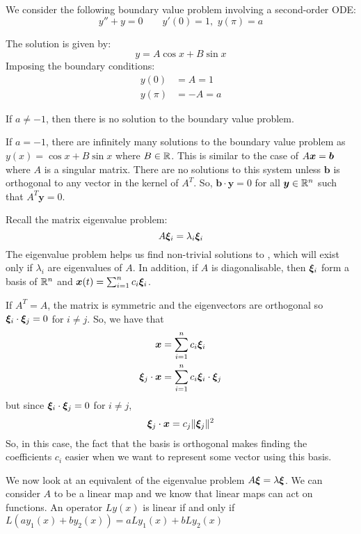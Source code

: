 \begin{eg}
	We consider the following boundary value problem involving a second-order ODE:
	\[
	y'' + y = 0 \qquad y'(0)=1, \,\, y(\pi) = a
	\]
	
	The solution is given by: 
	\[
	y = A \cos{x} + B \sin{x}
	\]
	Imposing the boundary conditions:
	\begin{align*}
		y(0) &= A = 1 \\
		y(\pi) &= -A = a
	\end{align*}
	
	If $a \neq -1$, then there is no solution to the boundary value problem.
	
	If $a = -1$, there are infinitely many solutions to the boundary value problem as $y(x) = \cos{x} + B\sin{x}$ where $B \in \mathbb{R}$. This is similar to the case of $A\bm{x} = \bm{b}$ where $A$ is a singular matrix. There are no solutions to this system unless $\bm{b}$ is orthogonal to any vector in the kernel of $A^T$. So, $\bm{b} \cdot \bm{y} = 0$ for all $\bm{y} \in \mathbb{R}^n$ such that $A^T \bm{y} = 0$.
	
	Recall the matrix eigenvalue problem: 
	\begin{equation}\label{eq4.1}
		A \bm{\xi}_i = \lambda_i \bm{\xi}_i
	\end{equation}
	The eigenvalue problem helps us find non-trivial solutions to , which will exist only if $\lambda_i$ are eigenvalues of $A$. In addition, if $A$ is diagonalisable, then $\bm{\xi}_i$ form a basis of $\mathbb{R}^n$ and $\bm{x}(t) = \sum_{i=1}^n c_i \bm{\xi}_i$.
	
	If $A^T = A$, the matrix is symmetric and the eigenvectors are orthogonal so $\bm{\xi}_i \cdot \bm{\xi}_j = 0$ for $i \neq j$. So, we have that
	\begin{align*}
		\bm{x} &= \sum_{i=1}^n c_i \bm{\xi}_i \\
		\bm{\xi}_j \cdot \bm{x} &= \sum_{i=1}^n c_i \bm{\xi}_i \cdot \bm{\xi}_j
	\end{align*}
	but since $\bm{\xi}_i \cdot \bm{\xi}_j = 0$ for $i \neq j$, 
	\begin{align*}
		\bm{\xi}_j \cdot \bm{x} = c_j \Vert \bm{\xi}_j \Vert^2
	\end{align*}
	So, in this case, the fact that the basis is orthogonal makes finding the coefficients $c_i$ easier when we want to represent some vector using this basis.
\end{eg}

We now look at an equivalent of the eigenvalue problem $A \bm{\xi} = \lambda \bm{\xi}$. We can consider $A$ to be a linear map and we know that linear maps can act on functions. An operator $Ly(x)$ is linear if and only if $L(ay_1(x) + by_2(x)) = aLy_1(x) + bLy_2(x)$

